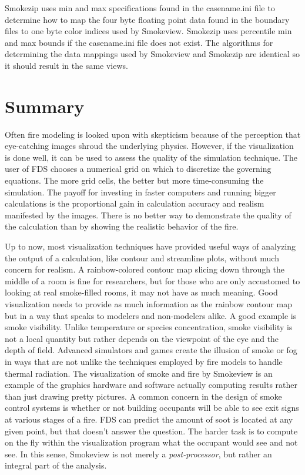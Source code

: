 \documentclass[11pt,twoside]{book}
\begin{document}
Smokezip uses min and max specifications found in the casename.ini
file to determine how to map the four byte floating point data
found in the boundary files to one byte color indices used by
Smokeview. Smokezip uses percentile min and max bounds if the
casename.ini file does not exist. The algorithms for determining
the data mappings used by Smokeview and Smokezip are identical so it
should result in the same views.


\chapter{Summary}
Often fire modeling is looked upon with skepticism because of the
perception that eye-catching images shroud the underlying physics.
However, if the visualization is done well, it can be used to
assess the quality of the simulation technique. The user of FDS
chooses a numerical grid on which to discretize the governing
equations. The more grid cells, the better but more time-consuming
the simulation. The payoff for investing in faster computers and
running bigger calculations is the proportional gain in calculation accuracy and realism
manifested by the images. There is no better way to demonstrate
the quality of the calculation than by showing the realistic
behavior of the fire.

Up to now, most visualization techniques have provided useful ways
of analyzing the output of a calculation, like contour and
streamline plots, without much concern for realism. A
rainbow-colored contour map slicing down through the middle of a
room is fine for researchers, but for those who are only
accustomed to looking at real smoke-filled rooms, it may not have
as much meaning. Good visualization needs to provide as much
information as the rainbow contour map but in a way that speaks to
modelers and non-modelers alike. A good example is smoke
visibility. Unlike temperature or species concentration, smoke
visibility is not a local quantity but rather depends on the
viewpoint of the eye and the depth of field. Advanced simulators
and games create the illusion of smoke or fog in ways that are not
unlike the techniques employed by fire models to handle thermal
radiation. The visualization of smoke and fire by Smokeview is an
example of the graphics hardware and software actually computing
results rather than just drawing pretty pictures. A common concern
in the design of smoke control systems is whether or not building
occupants will be able to see exit signs at various stages of a
fire. FDS can predict the amount of soot is located at any given
point, but that doesn't answer the question. The harder task is to
compute on the fly within the visualization program what the
occupant would see and not see. In this sense, Smokeview is not
merely a {\em post-processor}, but rather an integral part of the
analysis.
\end{document}
